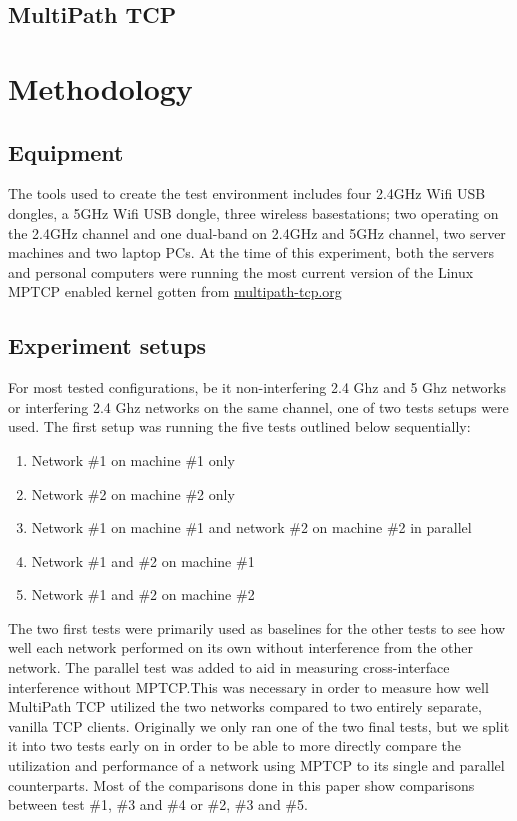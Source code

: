\documentclass[12pt,a4paper]{article}
\begin{document}
\subsection{MultiPath TCP}

\section{Methodology}
\subsection{Equipment}
The tools used to create the test environment includes four 2.4GHz Wifi USB
dongles, a 5GHz Wifi USB dongle, three wireless basestations; two operating on
the 2.4GHz channel and one dual-band on 2.4GHz and  5GHz channel, two server
machines and two laptop PCs. At the time of this experiment, both the servers
and personal computers were running the most current version of the Linux MPTCP
enabled kernel gotten from \href{http://multipath-tcp.org/}{multipath-tcp.org}

\subsection{Experiment setups}
For most tested configurations, be it non-interfering 2.4 Ghz and 5 Ghz networks
or interfering 2.4 Ghz networks on the same channel, one of two tests setups
were used. The first setup was running the five tests outlined below
sequentially:

\begin{enumerate}
  \item Network \#1 on machine \#1 only
  \item Network \#2 on machine \#2 only
  \item Network \#1 on machine \#1 and network \#2 on machine \#2 in parallel
  \item Network \#1 and \#2 on machine \#1
  \item Network \#1 and \#2 on machine \#2
\end{enumerate}

The two first tests were primarily used as baselines for the other tests to see
how well each network performed on its own without interference from the other
network. The parallel test was added to aid in measuring cross-interface
interference without MPTCP.\@ This was necessary in order to measure how well
MultiPath TCP utilized the two networks compared to two entirely separate,
vanilla TCP clients. Originally we only ran one of the two final tests, but we
split it into two tests early on in order to be able to more directly compare
the utilization and performance of a network using MPTCP to its single and
parallel counterparts. Most of the comparisons done in this paper show
comparisons between test \#1, \#3 and \#4 or \#2, \#3 and \#5.
\end{document}
